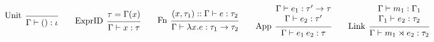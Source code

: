 \documentclass{article}
\theoremstyle{definition}
\newcommand*{\cons}{::}
\newcommand*{\link}[2]{{#1}\rtimes{#2}}
\begin{document}
\begin{figure}[h!]
  \footnotesize
  \begin{flushright}
  \end{flushright}
  \centering
  \vspace{0pt} %
  \[
    \begin{prooftree}
      \infer[left label=Unit]0{
      \Gamma\vdash():\iota
      }
    \end{prooftree}\qquad
    \begin{prooftree}
      \hypo{\tau=\Gamma(x)}
      \infer[left label=ExprID]1{
      \Gamma\vdash x:\tau
      }
    \end{prooftree}\qquad
    \begin{prooftree}
      \hypo{(x,\tau_1)\cons\Gamma\vdash e:\tau_2}
      \infer[left label=Fn]1{
      \Gamma\vdash\lambda x.e:\tau_1\rightarrow\tau_2
      }
    \end{prooftree}\qquad
    \begin{prooftree}
      \hypo{
        \begin{matrix}
          \Gamma\vdash e_1:\tau'\rightarrow\tau \\
          \Gamma\vdash e_2:\tau'
        \end{matrix}
      }
      \infer[left label={App}]1{
      \Gamma\vdash e_{1}\:e_{2}:\tau
      }
    \end{prooftree}\qquad
    \begin{prooftree}
      \hypo{
        \begin{matrix}
          \Gamma\vdash m_1:\Gamma_1 \\
          \Gamma_1\vdash e_2:\tau_2
        \end{matrix}
      }
      \infer[left label=Link]1{
      \Gamma\vdash\link{m_{1}}{e_{2}}:\tau_2
      }
    \end{prooftree}
  \]


\end{figure}
\end{document}
